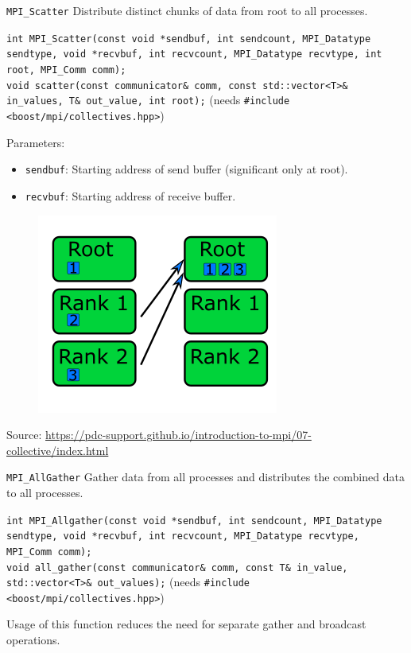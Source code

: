 \documentclass{beamer}
\begin{document}
\begin{frame}{\texttt{MPI\_Scatter}}
  Distribute distinct chunks of data from root to all processes.

  {
    \footnotesize
    \texttt{int MPI\_Scatter(const void *sendbuf, int sendcount, MPI\_Datatype sendtype, void *recvbuf, int recvcount, MPI\_Datatype recvtype, int root, MPI\_Comm comm);} \\
    \texttt{void scatter(const communicator\& comm, const std::vector<T>\& in\_values, T\& out\_value, int root);} (needs \texttt{\#include <boost/mpi/collectives.hpp>})
  }

  \begin{minipage}[t]{0.6\textwidth}
    Parameters:
    \begin{itemize}
      \item \texttt{sendbuf}: Starting address of send buffer (significant only at root).
      \item \texttt{recvbuf}: Starting address of receive buffer.
    \end{itemize}
  \end{minipage}
  \hfill
  \begin{minipage}[t]{0.35\textwidth}
    \begin{figure}[h]
      \includegraphics[]{images/gather.png}
    \end{figure}
  \end{minipage}
  {\footnotesize Source: \href{https://pdc-support.github.io/introduction-to-mpi/07-collective/index.html}{https://pdc-support.github.io/introduction-to-mpi/07-collective/index.html}}
\end{frame}

\begin{frame}{\texttt{MPI\_AllGather}}
  Gather data from all processes and distributes the combined data to all processes.

  {
    \footnotesize
    \texttt{int MPI\_Allgather(const void *sendbuf, int sendcount, MPI\_Datatype sendtype, void *recvbuf, int recvcount, MPI\_Datatype recvtype, MPI\_Comm comm);} \\
    \texttt{void all\_gather(const communicator\& comm, const T\& in\_value, 
    std::vector<T>\& out\_values);} (needs \texttt{\#include <boost/mpi/collectives.hpp>})
  }

  Usage of this function reduces the need for separate gather and broadcast operations.
\end{frame}
\end{document}
